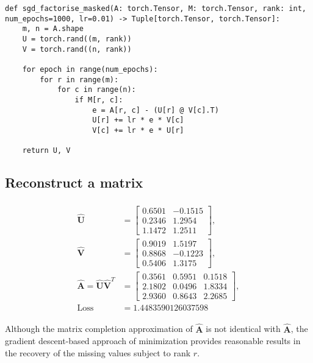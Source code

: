 \documentclass[10pt, twocolumn]{article}
\begin{document}
\begin{lstlisting}
def sgd_factorise_masked(A: torch.Tensor, M: torch.Tensor, rank: int, num_epochs=1000, lr=0.01) -> Tuple[torch.Tensor, torch.Tensor]:
    m, n = A.shape
    U = torch.rand((m, rank))
    V = torch.rand((n, rank)) 

    for epoch in range(num_epochs):
        for r in range(m):
            for c in range(n):
                if M[r, c]:
                    e = A[r, c] - (U[r] @ V[c].T)
                    U[r] += lr * e * V[c]
                    V[c] += lr * e * U[r]

    return U, V
\end{lstlisting}

\subsection{Reconstruct a matrix}

\begin{align*}
    \begin{split}
    \hat{\pmb{U}} &=
    \begin{bmatrix}
        0.6501 & -0.1515\\
        0.2346 &  1.2954\\
        1.1472 & 1.2511
    \end{bmatrix},\\
    \hat{\pmb{V}} &=
    \begin{bmatrix}
        0.9019 &  1.5197\\
        0.8868 & -0.1223\\
        0.5406 &  1.3175
    \end{bmatrix},\\
    \hat{\pmb{A}} = \hat{\pmb{U}} \hat{\pmb{V}}^T &=
    \begin{bmatrix}
        0.3561 & 0.5951 & 0.1518\\
        2.1802 & 0.0496 & 1.8334\\
        2.9360 & 0.8643 & 2.2685
    \end{bmatrix},\\
    \text{Loss} &= 1.4483590126037598
    \end{split}
\end{align*}

Although the matrix completion approximation of $\hat{\pmb{A}}$ is not identical with $\hat{\pmb{A}}$, the gradient descent-based approach of minimization provides reasonable results in the recovery of the missing values subject to rank $r$.

\end{document}
